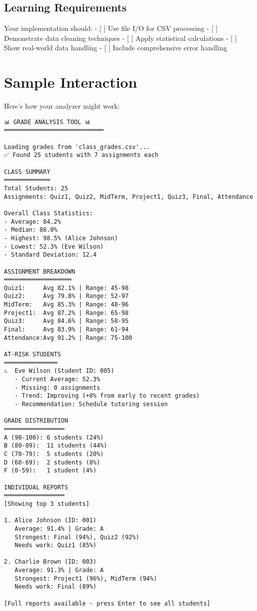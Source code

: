 \documentclass[
  letterpaper,
  DIV=11,
  numbers=noendperiod,
  oneside]{scrreprt}
\begin{document}
\subsection{Learning Requirements}\label{learning-requirements-8}

Your implementation should: - {[} {]} Use file I/O for CSV processing -
{[} {]} Demonstrate data cleaning techniques - {[} {]} Apply statistical
calculations - {[} {]} Show real-world data handling - {[} {]} Include
comprehensive error handling

\section{Sample Interaction}\label{sample-interaction-8}

Here's how your analyzer might work:

\begin{verbatim}
📊 GRADE ANALYSIS TOOL 📊
════════════════════════════

Loading grades from 'class_grades.csv'...
✅ Found 25 students with 7 assignments each

CLASS SUMMARY
═════════════
Total Students: 25
Assignments: Quiz1, Quiz2, MidTerm, Project1, Quiz3, Final, Attendance

Overall Class Statistics:
- Average: 84.2%
- Median: 86.0%
- Highest: 98.5% (Alice Johnson)
- Lowest: 52.3% (Eve Wilson)
- Standard Deviation: 12.4

ASSIGNMENT BREAKDOWN
═══════════════════
Quiz1:     Avg 82.1% | Range: 45-98
Quiz2:     Avg 79.8% | Range: 52-97
MidTerm:   Avg 85.3% | Range: 48-96
Project1:  Avg 87.2% | Range: 65-98
Quiz3:     Avg 84.6% | Range: 58-95
Final:     Avg 83.9% | Range: 61-94
Attendance:Avg 91.2% | Range: 75-100

AT-RISK STUDENTS
═══════════════
⚠️  Eve Wilson (Student ID: 005)
   - Current Average: 52.3%
   - Missing: 0 assignments
   - Trend: Improving (+8% from early to recent grades)
   - Recommendation: Schedule tutoring session

GRADE DISTRIBUTION
═════════════════
A (90-100): 6 students (24%)
B (80-89):  11 students (44%)
C (70-79):  5 students (20%)
D (60-69):  2 students (8%)
F (0-59):   1 student (4%)

INDIVIDUAL REPORTS
═════════════════
[Showing top 3 students]

1. Alice Johnson (ID: 001)
   Average: 91.4% | Grade: A
   Strongest: Final (94%), Quiz2 (92%)
   Needs work: Quiz1 (85%)
   
2. Charlie Brown (ID: 003)
   Average: 91.3% | Grade: A
   Strongest: Project1 (96%), MidTerm (94%)
   Needs work: Final (89%)

[Full reports available - press Enter to see all students]
\end{verbatim}
\end{document}
